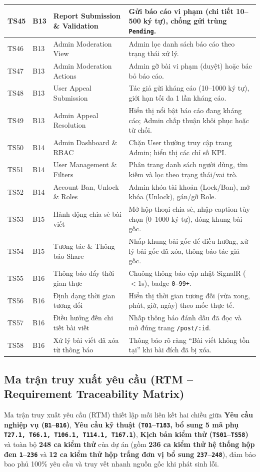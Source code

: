 \documentclass[11pt,a4paper]{article}
\begin{document}
\begin{longtable}{|C{1.3cm}|C{1.2cm}|L{4.8cm}|L{8.5cm}|}
TS45 & B13 & Report Submission \& Validation & Gửi báo cáo vi phạm (chi tiết 10--500 ký tự), chống gửi trùng \texttt{Pending}. \\ \hline
TS46 & B13 & Admin Moderation View & Admin lọc danh sách báo cáo theo trạng thái xử lý. \\ \hline
TS47 & B13 & Admin Moderation Actions & Admin gỡ bài vi phạm (duyệt) hoặc bác bỏ báo cáo. \\ \hline
TS48 & B13 & User Appeal Submission & Tác giả gửi kháng cáo (10--1000 ký tự), giới hạn tối đa 1 lần kháng cáo. \\ \hline
TS49 & B13 & Admin Appeal Resolution & Hiển thị nổi bật báo cáo đang kháng cáo; Admin chấp thuận khôi phục hoặc từ chối. \\ \hline
TS50 & B14 & Admin Dashboard \& RBAC & Chặn User thường truy cập trang Admin; hiển thị các chỉ số KPI. \\ \hline
TS51 & B14 & User Management \& Filters & Phân trang danh sách người dùng, tìm kiếm và lọc theo trạng thái/vai trò. \\ \hline
TS52 & B14 & Account Ban, Unlock \& Roles & Admin khóa tài khoản (Lock/Ban), mở khóa (Unlock), gán/gỡ Role. \\ \hline
TS53 & B15 & Hành động chia sẻ bài viết & Mở hộp thoại chia sẻ, nhập caption tùy chọn (0--1000 ký tự), đóng khung bài gốc. \\ \hline
TS54 & B15 & Tương tác \& Thông báo Share & Nhấp khung bài gốc để điều hướng, xử lý bài gốc đã xóa, thông báo tác giả gốc. \\ \hline
TS55 & B16 & Thông báo đẩy thời gian thực & Chuông thông báo cập nhật SignalR ($<1$s), badge \texttt{0--99+}. \\ \hline
TS56 & B16 & Định dạng thời gian tương đối & Hiển thị thời gian tương đối (vừa xong, phút, giờ, ngày) theo mốc thực tế. \\ \hline
TS57 & B16 & Điều hướng đến chi tiết bài viết & Nhấp thông báo đánh dấu đã đọc và mở đúng trang \texttt{/post/:id}. \\ \hline
TS58 & B16 & Xử lý bài viết đã xóa từ thông báo & Thông báo rõ ràng ``Bài viết không tồn tại'' khi bài đích đã bị xóa. \\ \hline
\end{longtable}

\subsection{Ma trận truy xuất yêu cầu (RTM -- Requirement Traceability Matrix)}
Ma trận truy xuất yêu cầu (RTM) thiết lập mối liên kết hai chiều giữa \textbf{Yêu cầu nghiệp vụ (\texttt{B1}--\texttt{B16})}, \textbf{Yêu cầu kỹ thuật (\texttt{T01}--\texttt{T183}, bổ sung 5 mã phụ \texttt{T27.1, T66.1, T106.1, T114.1, T167.1})}, \textbf{Kịch bản kiểm thử (\texttt{TS01}--\texttt{TS58})} và toàn bộ \textbf{248 ca kiểm thử} của dự án (gồm \textbf{236 ca kiểm thử hệ thống hộp đen \texttt{1}--\texttt{236}} và \textbf{12 ca kiểm thử hộp trắng đơn vị bổ sung \texttt{237}--\texttt{248}}), đảm bảo bao phủ 100\% yêu cầu và truy vết nhanh nguồn gốc khi phát sinh lỗi.
\end{document}
